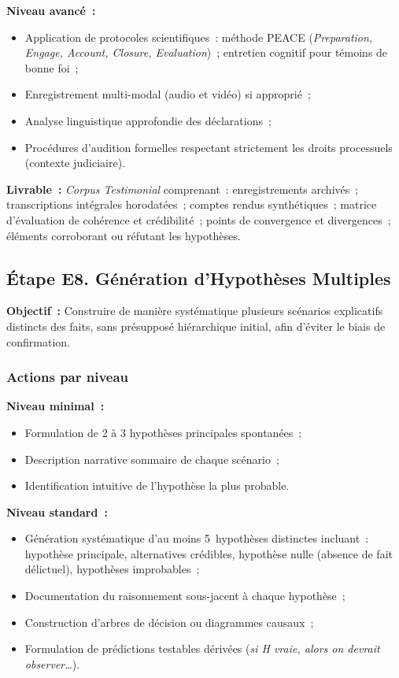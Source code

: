\textbf{Niveau avancé~:}
\begin{itemize}
    \item Application de protocoles scientifiques~: méthode PEACE
          (\textit{Preparation, Engage, Account, Closure, Evaluation})~;
          entretien cognitif pour témoins de bonne foi~;
    \item Enregistrement multi-modal (audio et vidéo) si approprié~;
    \item Analyse linguistique approfondie des déclarations~;
    \item Procédures d'audition formelles respectant strictement les droits
          processuels (contexte judiciaire).
\end{itemize}

\textbf{Livrable~:} \textit{Corpus Testimonial} comprenant~: enregistrements
archivés~; transcriptions intégrales horodatées~; comptes rendus synthétiques~;
matrice d'évaluation de cohérence et crédibilité~; points de convergence et
divergences~; éléments corroborant ou réfutant les hypothèses.

\subsection{Étape E8. Génération d'Hypothèses Multiples}

\textbf{Objectif~:} Construire de manière systématique plusieurs scénarios
explicatifs distincts des faits, sans présupposé hiérarchique initial,
afin d'éviter le biais de confirmation.

\subsubsection*{Actions par niveau}

\textbf{Niveau minimal~:}
\begin{itemize}
    \item Formulation de 2 à 3 hypothèses principales spontanées~;
    \item Description narrative sommaire de chaque scénario~;
    \item Identification intuitive de l'hypothèse la plus probable.
\end{itemize}

\textbf{Niveau standard~:}
\begin{itemize}
    \item Génération systématique d'au moins 5~hypothèses distinctes incluant~:
          hypothèse principale, alternatives crédibles, hypothèse nulle
          (absence de fait délictuel), hypothèses improbables~;
    \item Documentation du raisonnement sous-jacent à chaque hypothèse~;
    \item Construction d'arbres de décision ou diagrammes causaux~;
    \item Formulation de prédictions testables dérivées
          (\textit{si H vraie, alors on devrait observer\ldots}).
\end{itemize}

